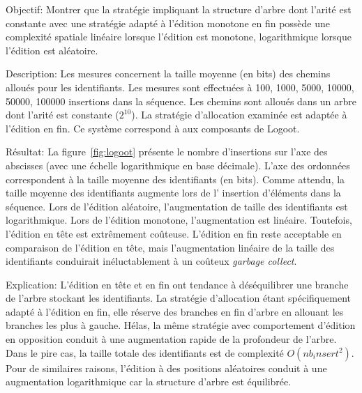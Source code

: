 \begin{asparadesc}
\item [Objectif:] Montrer que la stratégie impliquant la structure d'arbre dont
  l'arité est constante avec une stratégie adapté à l'édition monotone en fin
  possède une complexité spatiale linéaire lorsque l'édition est monotone,
  logarithmique lorsque l'édition est aléatoire.
\item [Description:] Les mesures concernent la taille moyenne (en bits) des
  chemins alloués pour les identifiants. Les mesures sont effectuées à 100,
  1000, 5000, 10000, 50000, 100000 insertions dans la séquence. Les chemins sont
  alloués dans un arbre dont l'arité est constante ($2^{10}$). La stratégie
  d'allocation examinée est adaptée à l'édition en fin. Ce système correspond à
  aux composants de Logoot.
\item [Résultat:] La figure~\ref{fig:logoot} présente le nombre d'insertions sur
  l'axe des abscisses (avec une échelle logarithmique en base décimale). L'axe
  des ordonnées correspondent à la taille moyenne des identifiants (en
  bits). Comme attendu, la taille moyenne des identifiants augmente lors de l'
  insertion d'éléments dans la séquence. Lors de l'édition aléatoire,
  l'augmentation de taille des identifiants est logarithmique. Lors de l'édition
  monotone, l'augmentation est linéaire. Toutefois, l'édition en tête est
  extrêmement coûteuse. L'édition en fin reste acceptable en comparaison de
  l'édition en tête, mais l'augmentation linéaire de la taille des identifiants 
  conduirait inéluctablement à un coûteux \emph{garbage collect}.
\item [Explication:] L'édition en tête et en fin ont tendance à déséquilibrer
  une branche de l'arbre stockant les identifiants. La stratégie d'allocation
  étant spécifiquement adapté à l'édition en fin, elle réserve des branches en
  fin d'arbre en allouant les branches les plus à gauche. Hélas, la même
  stratégie avec comportement d'édition en opposition conduit à une augmentation
  rapide de la profondeur de l'arbre. Dans le pire cas, la taille totale des
  identifiants est de complexité $O(nb_insert^2)$. Pour de similaires raisons,
  l'édition à des positions aléatoires conduit à une augmentation logarithmique
  car la structure d'arbre est équilibrée.
\end{asparadesc}

